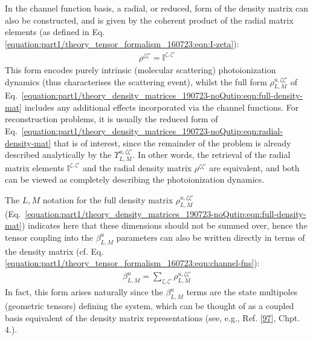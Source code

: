 \documentclass[letterpaper,table,10pt,english]{jupyterBook}
\begin{document}
\sphinxAtStartPar
In the channel function basis, a radial, or reduced, form of the density matrix can also be constructed, and is given by the coherent product of the radial matrix elements (as defined in Eq. \eqref{equation:part1/theory_tensor_formalism_160723:eqn:I-zeta}):
\begin{equation}\label{equation:part1/theory_density_matrices_190723-noQutip:eqn:radial-density-mat}
\begin{split}
\rho^{\zeta\zeta'} = \mathbb{I}^{\zeta,\zeta'}
\end{split}
\end{equation}
\sphinxAtStartPar
This form encodes purely intrinsic (molecular scattering) photoionization dynamics (thus characterises the scattering event), whilst the full form \({\rho}_{L,M}^{u,\zeta\zeta'}\) of Eq. \eqref{equation:part1/theory_density_matrices_190723-noQutip:eqn:full-density-mat} includes any additional effects incorporated via the channel functions. For reconstruction problems, it is usually the reduced form of Eq. \eqref{equation:part1/theory_density_matrices_190723-noQutip:eqn:radial-density-mat} that is of interest, since the remainder of the problem is already described analytically by the {\hyperref[\detokenize{backmatter/glossary:term-channel-functions}]{}} \(\varUpsilon_{L,M}^{u,\zeta\zeta'}\). In other words, the retrieval of the radial matrix elements \(\mathbb{I}^{\zeta,\zeta'}\) and the radial density matrix \(\rho^{\zeta\zeta'}\) are equivalent, and both can be viewed as completely describing the photoionization dynamics.

\sphinxAtStartPar
The \(L,M\) notation for the full density matrix \({\rho}_{L,M}^{u,\zeta\zeta'}\) (Eq. \eqref{equation:part1/theory_density_matrices_190723-noQutip:eqn:full-density-mat}) indicates here that these dimensions should not be summed over, hence the tensor coupling into the \(\beta_{L,M}^{u}\) parameters can also be written directly in terms of the density matrix (cf. Eq. \eqref{equation:part1/theory_tensor_formalism_160723:eqn:channel-fns}):
\begin{equation}\label{equation:part1/theory_density_matrices_190723-noQutip:eqn:beta-density-mat}
\begin{split}
\beta_{L,M}^{u}=\sum_{\zeta,\zeta'}{\rho}_{L,M}^{u,\zeta\zeta'}
\end{split}
\end{equation}
\sphinxAtStartPar
In fact, this form arises naturally since the \(\beta_{L,M}^{u}\) terms are the state multipoles (geometric tensors) defining the system, which can be thought of as a coupled basis equivalent of the density matrix representations (see, e.g., Ref. {[}\hyperlink{cite.backmatter/bibliography:id533}{97}{]}, Chpt. 4.).
\end{document}
